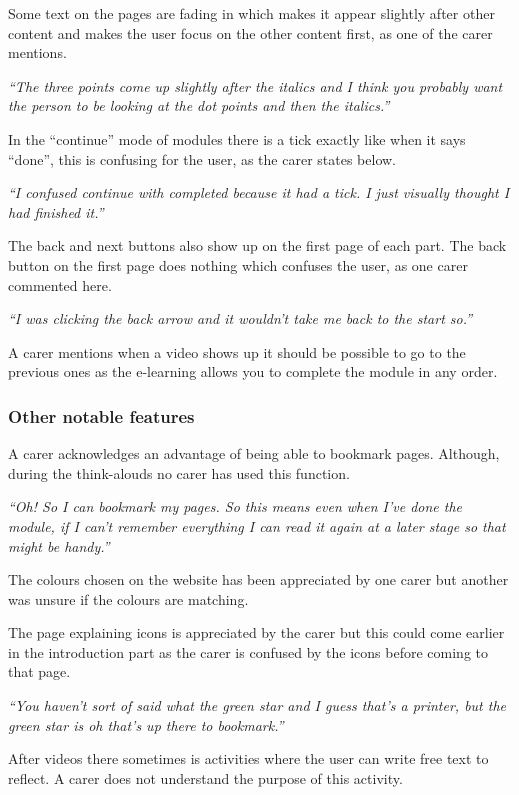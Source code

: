 \documentclass{sigchi}
\begin{document}
Some text on the pages are fading in which makes it appear slightly after other content and makes the user focus on the other content first, as one of the carer mentions.

\textit{“The three points come up slightly after the italics and I think you probably want the person to be looking at the dot points and then the italics.”}

In the “continue” mode of modules there is a tick exactly like when it says “done”, this is confusing for the user, as the carer states below. 

\textit{“I confused continue with completed because it had a tick. I just visually thought I had finished it.”}

The back and next buttons also show up on the first page of each part. The back button on the first page does nothing which confuses the user, as one carer commented here.

\textit{“I was clicking the back arrow and it wouldn't take me back to the start so.”}

A carer mentions when a video shows up it should be possible to go to the previous ones as the e-learning allows you to complete the module in any order.

\subsubsection{Other notable features}
A carer acknowledges an advantage of being able to bookmark pages. Although, during the think-alouds no carer has used this function. 

\textit{“Oh! So I can bookmark my pages. So this means even when I’ve done the module, if I can’t remember everything I can read it again at a later stage so that might be handy.”}

The colours chosen on the website has been appreciated by one carer but another was unsure if the colours are matching. 

The page explaining icons is appreciated by the carer but this could come earlier in the introduction part as the carer is confused by the icons before coming to that page.

\textit{“You haven’t sort of said what the green star and I guess that’s a printer, but the green star is oh that’s up there to bookmark.”}

After videos there sometimes is activities where the user can write free text to reflect. A carer does not understand the purpose of this activity. 
\end{document}
